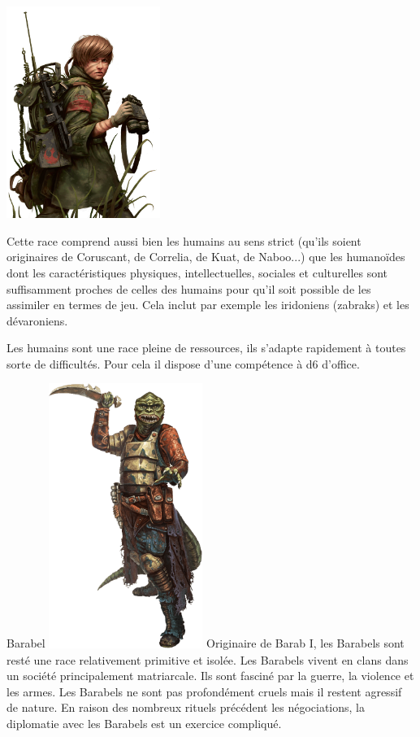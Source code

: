 \includegraphics[width=5cm]{img/races/humain.png} 

Cette race comprend aussi bien les humains au sens strict (qu’ils soient originaires de Coruscant, de Correlia, de Kuat, de Naboo...) que les humanoïdes dont les caractéristiques physiques, intellectuelles, sociales et culturelles sont suffisamment proches de celles des humains pour qu’il soit possible de les assimiler en termes de jeu. Cela inclut par exemple les iridoniens (zabraks) et les dévaroniens.

\begin{description}[align=left]
\item [Adaptabilité] Les humains sont une race pleine de ressources, ils s'adapte rapidement à toutes sorte de difficultés. Pour cela il dispose d'une compétence à d6 d'office.
\end{description}

\newpage
\begin{monsterbox}{Barabel}
	\textit{\includegraphics[width=5cm]{img/races/barabel.png}}
	\hline
	\basics[%
		type = Reptile,
		planet = Barab I,
		language = Barabel
	]
	\hline
	\traits
	\stats
	\hline
	Originaire de Barab I, les Barabels sont resté une race relativement primitive et isolée. Les Barabels vivent en clans dans un société principalement matriarcale. Ils sont fasciné par la guerre, la violence et les armes. Les Barabels ne sont pas profondément cruels mais il restent agressif de nature. En raison des nombreux rituels précédent les négociations, la diplomatie avec les Barabels est un exercice compliqué.
\end{monsterbox}


